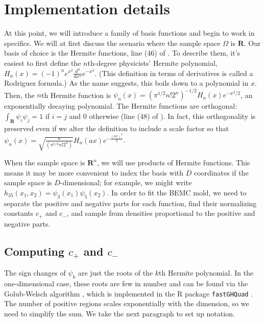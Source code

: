 \documentclass{article}
\begin{document}
\section{Implementation details}
At this point, we will introduce a family of basis functions and begin to work in specifics. We will at first discuss the scenario where the sample space $\Omega$ is $\mathbf{R}$. Our basis of choice is the Hermite functions, line (46) of \cite{mathworld_hermite}. To describe them, it's easiest to first define the $n$th-degree physicists' Hermite polynomial, $H_n(x)=(-1)^ne^{x^2}\frac{d^n}{dx^n}e^{-x^2}$. (This definition in terms of derivatives is called a Rodriguez formula.) As the name suggests, this boils down to a polynomial in $x$. Then, the $n$th Hermite function is $\psi_n(x) = (\pi^{1/2}n!2^n)^{-1/2} H_n(x)e^{-x^2/2}$, an exponentially decaying polynomial. The Hermite functions are orthogonal: $\int_{\mathbf{R}}\psi_i\psi_j=1$ if $i = j$ and $0$ otherwise (line (48) of \cite{mathworld_hermite}). In fact, this orthogonality is preserved even if we alter the definition to include a scale factor so that $\psi_n(x) =\sqrt{\frac{a}{(\pi^{1/2}n!2^n)}} H_n(ax)e^{-\frac{(ax)^2}{2}}$.

When the sample space is $\mathbf{R}^n$, we will use products of Hermite functions. This means it may be more convenient to index the basis with $D$ coordinates if the sample space is $D$-dimensional;  for example, we might write $h_{35}(x_1, x_2)=\psi_3(x_1)\psi_5(x_2)$. In order to fit the BEMC mold, we need to separate the positive and negative parts for each function, find their normalizing constants $c_+$ and $c_-$, and sample from densities proportional to the positive and negative parts. 

\subsection{Computing $c_+$ and $c_-$}
The sign changes of $\psi_k$ are just the roots of the $k$th Hermite polynomial. In the one-dimensional case, these roots are few in number and can be found via the Golub-Welsch algorithm \cite{Golub:1969:CGQ}, which is implemented in the R package \texttt{fastGHQuad} \cite{Blocker:2014rz}. The number of positive regions scales exponentially with the dimension, so we need to simplify the sum. We take the next paragraph to set up notation.
\end{document}
